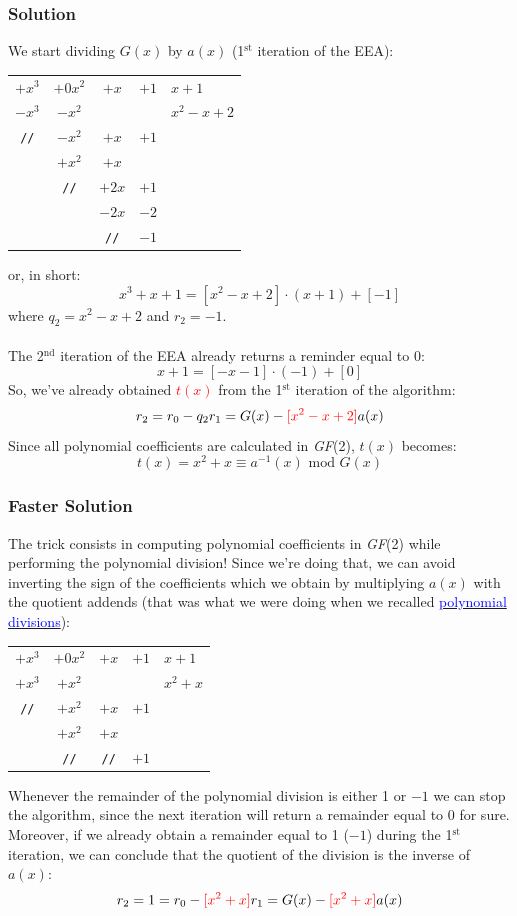\documentclass[11pt, a4paper]{article}
\newcommand{\gf}[1]{\textit{GF}(#1)}
\newcommand{\mymod}{
    \text{ mod }
}
\begin{document}
\subsubsection*{Solution}
We start dividing $G(x)$ by $a(x)$ (1$^\text{st}$ iteration of the EEA):
\begin{center}
    \begin{tabular}{cccc|l}
         $+x^3$&$+0x^2$&$+x$&$+1$&$x+1$\\
         \cline{5-5}
         $-x^3$&$-x^2$&&&$x^2-x+2$\\
         \cline{1-4}
         \texttt{//}&$-x^2$&$+x$&$+1$&\\
         &$+x^2$&$+x$&&\\
         \cline{2-4}
         &\texttt{//}&$+2x$&$+1$&\\
         &&$-2x$&$-2$&\\
         \cline{3-4}
         &&\texttt{//}&$-1$&
    \end{tabular}
\end{center}
or, in short:
$$x^3+x+1=[x^2-x+2]\cdot(x+1)+[-1]$$
where $q_2=x^2-x+2$ and $r_2=-1$.\\\\
The 2$^\text{nd}$ iteration of the EEA already returns a reminder equal to 0:
$$x+1=[-x-1]\cdot(-1)+[0]$$
So, we've already obtained \textcolor{red}{$t(x)$} from the 1$^\text{st}$ iteration of the algorithm:
$$r_2=r_0-q_2r_1=G(x)-\textcolor{red}{[x^2-x+2]}a(x)$$
Since all polynomial coefficients are calculated in \gf{2}, $t(x)$ becomes:
$$t(x)=x^2+x\equiv a^{-1}(x)\mymod G(x)$$
\subsubsection*{Faster Solution}
The trick consists in computing polynomial coefficients in \gf{2} while performing the polynomial division! Since we're doing that, we can avoid inverting the sign of the coefficients which we obtain by multiplying $a(x)$ with the quotient addends (that was what we were doing when we recalled \hyperlink{polDiv}{\textcolor{blue}{polynomial divisions}}):
\begin{center}
    \begin{tabular}{cccc|l}
         $+x^3$&$+0x^2$&$+x$&$+1$&$x+1$\\
         \cline{5-5}
         $+x^3$&$+x^2$&&&$x^2+x$\\
         \cline{1-4}
         \texttt{//}&$+x^2$&$+x$&$+1$&\\
         &$+x^2$&$+x$&&\\
         \cline{2-4}
         &\texttt{//}&\texttt{//}&$+1$&
    \end{tabular}
\end{center}
Whenever the remainder of the polynomial division is either 1 or $-1$ we can stop the algorithm, since the next iteration will return a remainder equal to 0 for sure. Moreover, if we already obtain a remainder equal to 1 ($-1$) during the 1$^{\text{st}}$ iteration, we can conclude that the quotient of the division is the inverse of $a(x)$:
$$r_2=1=r_0-\textcolor{red}{[x^2+x]}r_1=G(x)-\textcolor{red}{[x^2+x]}a(x)$$
\end{document}

